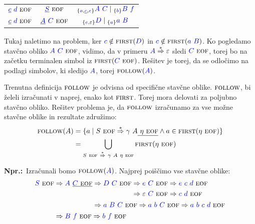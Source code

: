 \documentclass{article}
\newcommand{\Ex}{\textbf{Npr.:}\ }
\newcommand{\FIRST}{\textsc{first}}
\newcommand{\FOLLOW}{\textsc{follow}}
\newcommand{\EOF}{\textsc{eof}}
\newcommand{\Symbol}[1]{\textcolor{blue}{#1}}
\newcommand{\Null}{\varepsilon}
\newcommand{\Derive}{\Rightarrow}
\newcommand{\DeriveStar}{\overset{\ast}{\Rightarrow}}
\newcommand{\Seq}{\ }
\newcommand{\Union}{\mathrel{|}}
\newcommand{\Lookahead}[1]{{}_{\{{#1}\}}}
\begin{document}
\begin{center}
\begin{tabular}{|c|c|c|}
  \hline
  $\underline{\Symbol{c}} \Seq \Symbol{d} \Seq \EOF$ & $\underline{\Symbol{S}} \Seq \EOF$ & $\Lookahead{\Symbol{a}, \underline{\Symbol{c}}, \Symbol{e}} \Symbol{A} \Seq \Symbol{C} \Union \Lookahead{\Symbol{b}} \Symbol{B} \Seq \Symbol{f}$ \\ 
  $\underline{\Symbol{c}} \Seq \Symbol{d} \Seq \EOF$ & $\underline{\Symbol{A}} \Seq \Symbol{C} \Seq \EOF$ & $\Lookahead{\Symbol{e}, \Null} \Symbol{D} \Union \Lookahead{\Symbol{a}} \Symbol{a} \Seq \Symbol{B}$ \\ 
  \hline
\end{tabular}
\end{center}
Tukaj naletimo na problem, ker $\Symbol{c} \notin \FIRST(\Symbol{D})$ in $\Symbol{c} \notin \FIRST(\Symbol{a} \Seq \Symbol{B})$.
Ko pogledamo stavčno obliko $\Symbol{A} \Seq \Symbol{C} \Seq \EOF$, vidimo, da v primeru $\Symbol{A} \DeriveStar \varepsilon$ sledi $\Symbol{C} \Seq \EOF$, torej bo na začetku terminalen simbol iz $\FIRST(\Symbol{C} \Seq \EOF)$.
Rešitev je torej, da se odločimo na podlagi simbolov, ki sledijo $\Symbol{A}$, torej $\FOLLOW(\Symbol{A})$.

Trenutna definicija $\FOLLOW$ je odvisna od specifične stavčne oblike.
$\FOLLOW$, bi želeli izračunati v naprej, enako kot $\FIRST$.
Torej mora delovati za poljubno stavčno obliko.
Rešitev problema je, da $\FOLLOW$ izračunamo za vse možne stavčne oblike in rezultate združimo:
\begin{align*}
  \FOLLOW(A) &= \{a \mid S \Seq \EOF \DeriveStar \gamma \Seq A \underline{\Seq \eta \Seq \EOF} \land a \in \FIRST(\eta \Seq \EOF)\}\\
  &= \bigcup_{S \Seq \EOF\ \DeriveStar\ \gamma \Seq A \Seq \eta \Seq \EOF} \FIRST(\eta \Seq \EOF)
\end{align*}

\Ex Izračunali bomo $\FOLLOW(\Symbol{A})$.
Najprej poiščimo vse stavčne oblike:
\begin{equation*}
  \Symbol{S} \Seq \EOF \begin{aligned}[t]
    &\Derive \Symbol{A} \Seq \underline{\Symbol{C} \Seq \EOF} \begin{aligned}[t]
      &\Derive \Symbol{D} \Seq \Symbol{C} \Seq \EOF \begin{aligned}[t]
        &\Derive \Symbol{e} \Seq \Symbol{C} \Seq \EOF \Derive \Symbol{e} \Seq \Symbol{c} \Seq \Symbol{d} \Seq \EOF \\
        &\Derive \Null \Seq \Symbol{C} \Seq \EOF \Derive \Symbol{c} \Seq \Symbol{d} \Seq \EOF \\
      \end{aligned}\\
      &\Derive \Symbol{a} \Seq \Symbol{B} \Seq \Symbol{C} \Seq \EOF \Derive \Symbol{a} \Seq \Symbol{b} \Seq \Symbol{C} \Seq \EOF \Derive \Symbol{a} \Seq \Symbol{b} \Seq \Symbol{c} \Seq \Symbol{d} \Seq \EOF
    \end{aligned}\\
    &\Derive \Symbol{B} \Seq \Symbol{f} \Seq \EOF \Derive \Symbol{b} \Seq \Symbol{f} \Seq \EOF
  \end{aligned}
\end{equation*}
\end{document}
